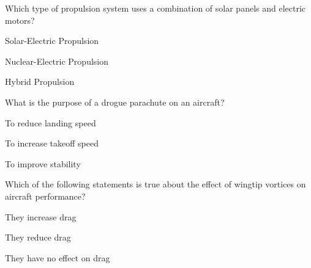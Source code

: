 \begin{enhancedmcq}{Which type of propulsion system uses a combination of solar panels and electric motors?}
\item Solar-Electric Propulsion
\item Nuclear-Electric Propulsion
\item Hybrid Propulsion

\end{enhancedmcq}
\begin{enhancedmcq}{What is the purpose of a drogue parachute on an aircraft?}
\item To reduce landing speed
\item To increase takeoff speed
\item To improve stability

\end{enhancedmcq}
\begin{enhancedmcq}{Which of the following statements is true about the effect of wingtip vortices on aircraft performance?}
\item They increase drag
\item They reduce drag
\item They have no effect on drag
\end{enhancedmcq}